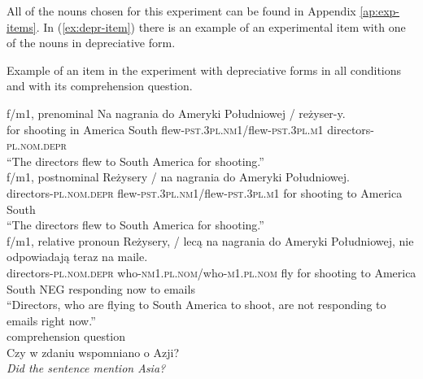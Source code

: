 All of the nouns chosen for this experiment can be found in Appendix \ref{ap:exp-items}. In (\ref{ex:depr-item}) there is an example of an experimental item with one of the nouns in depreciative form. 

\begin{exe}
  \ex\label{ex:depr-item} Example of an item in the experiment with depreciative forms in all conditions and with its comprehension question.
  \begin{xlist}
    \ex f/m1, prenominal
    \gll Na nagrania do Ameryki Południowej / reżyser-y.\\
    for shooting in America South flew\textsc{-pst.3pl.nm1}/flew\textsc{-pst.3pl.m1} directors\textsc{-pl.nom.depr}\\
    \glt ``The directors flew to South America for shooting.''\\
    
    \ex f/m1, postnominal
    \gll Reżysery / na nagrania do Ameryki Południowej.\\
    directors\textsc{-pl.nom.depr} flew\textsc{-pst.3pl.nm1}/flew\textsc{-pst.3pl.m1} for shooting to America South\\
    \glt ``The directors flew to South America for shooting.''\\
    
    \ex f/m1, relative pronoun
    \gll Reżysery, / lecą na nagrania do Ameryki Południowej, nie odpowiadają teraz na maile.\\
    directors\textsc{-pl.nom.depr} who\textsc{-nm1.pl.nom}/who\textsc{-m1.pl.nom} fly for shooting to America South \textsc{NEG} responding now to emails\\
    \glt ``Directors, who are flying to South America to shoot, are not responding to emails right now.''\\

    \ex comprehension question\\
    Czy w zdaniu wspomniano o Azji?\\
    \textsl{Did the sentence mention Asia?}
  \end{xlist}
\end{exe}

